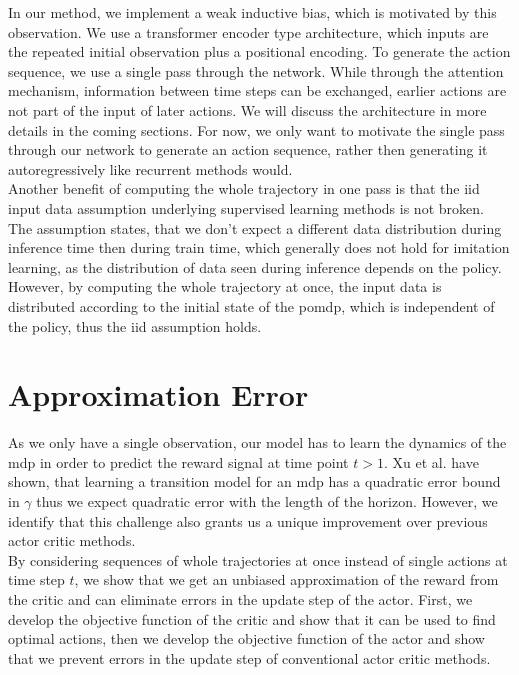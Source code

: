 In our method, we implement a weak inductive bias, which is motivated by this observation. We use a transformer encoder type architecture, which inputs are 
the repeated initial observation plus a positional encoding. To generate the action sequence, we use a single pass through the network. While through the attention mechanism, 
information between time steps can be exchanged, earlier actions are not part of the input of later actions. 
We will discuss the architecture in more details in the coming sections. For now, we only want to motivate the single pass through 
our network to generate an action sequence, rather then generating it autoregressively like recurrent methods would.\\ 

Another benefit of computing the whole trajectory in one pass is that the \ac{iid} input data 
assumption underlying supervised learning methods is not broken. The assumption states, that we don't expect a different data distribution during inference time 
then during train time, which generally does not hold for imitation learning, as the distribution of data seen during inference depends on the policy. 
However, by computing the whole trajectory at once, the input data is distributed according to the initial state of the \ac{pomdp}, which is independent of 
the policy, thus the \ac{iid} assumption holds.\\

\section{Approximation Error}
\label{inference_time_planning}
As we only have a single observation, our model has to learn the dynamics of the \ac{mdp} in order to predict the reward signal at time point $t > 1$. Xu et al. \cite{NEURIPS2020_b5c01503} 
have shown, that learning a transition model for an \ac{mdp} has a quadratic error bound in $\gamma$ thus we expect quadratic error with the length of the horizon. 
However, we identify that this challenge also grants us a unique improvement over previous actor critic methods.\\ 

By considering sequences of whole trajectories at once instead of single actions 
at time step $t$, 
we show that we get an unbiased approximation of the reward from the critic and can eliminate errors in the update step of the actor. First, we develop the objective function of the critic and 
show that it can be used to find optimal actions, then we develop the objective function of the actor and show that we prevent errors in the update step of conventional actor critic methods.\\

